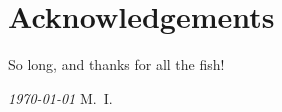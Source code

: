\chapter*{Acknowledgements}


So long, and thanks for all the fish!


\noindent\textit{\today}
\hfill M.~I.

